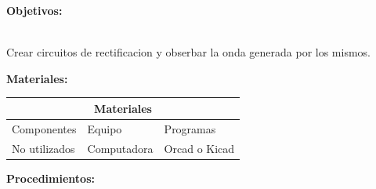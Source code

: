 \documentclass[letterpaper]{article}
\begin{document}
\newpage










    \begin{LARGE}
            \textbf{Objetivos:}\\
    \end{LARGE}
         \begin{large}
           \\ Crear circuitos de rectificacion y obserbar la onda generada por los mismos.

         \end{large}
\vspace{2cm}
    
    
    
    
    
    
    
    
    
        \begin{LARGE}
            \textbf{Materiales:}\\
         \end{LARGE}
    \begin{large}
      \begin{table}[htbt]
      \centering
      \begin{tabular}{|l|l|l|}
      \hline
      \multicolumn{3}{|c|}{Materiales}\\ \hline
      Componentes & Equipo & Programas\\
      \hline \hline
          No utilizados & Computadora & Orcad o Kicad\\ \hline
      \end{tabular}
      
      \end{table}
            
    \end{large}
    \vspace{1.2cm}
    
    
         \begin{LARGE}
            \textbf{Procedimientos:}\\
         \end{LARGE}
         
         
         
         
         
\end{document}

